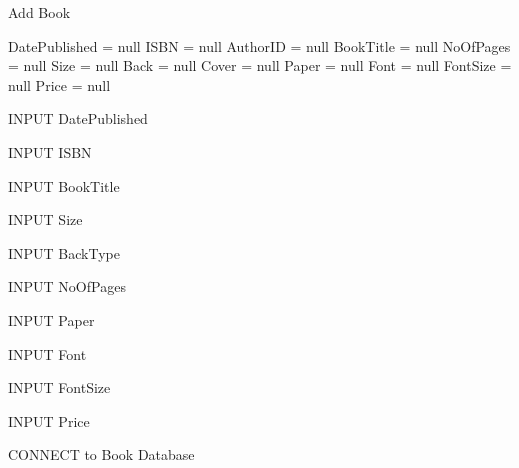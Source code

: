 \begin{algorithm}[H]
    \caption{Add Book}
\begin{algorithmic}[1]



DatePublished = null
ISBN = null
AuthorID = null
BookTitle = null
NoOfPages = null
Size = null
Back = null
Cover = null
Paper = null
Font = null
FontSize = null
Price = null


    INPUT DatePublished

\EndWhile


    INPUT ISBN

\EndWhile


    INPUT BookTitle

\EndWhile


    INPUT Size

\EndWhile


    INPUT BackType

\EndWhile


    INPUT NoOfPages

\EndWhile


    INPUT Paper

\EndWhile


    INPUT Font

\EndWhile


    INPUT FontSize

\EndWhile


    INPUT Price

\EndWhile

    
    CONNECT to Book Database
    
\EndIf

\EndFunction
\end{algorithmic}
\end{algorithm}


